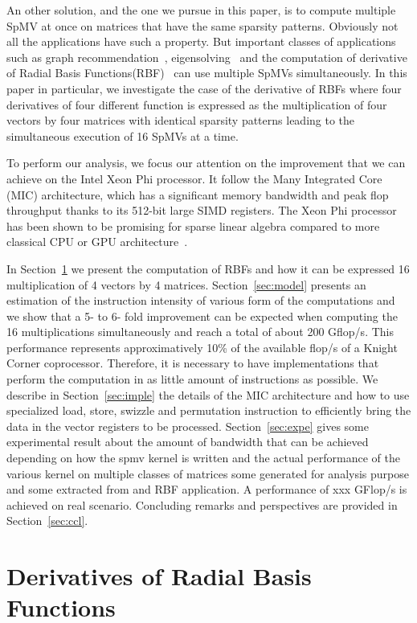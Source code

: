 \documentclass[10pt, conference, compsocconf]{IEEEtran}
\begin{document}
An other solution, and the one we pursue in this paper, is to compute
multiple SpMV at once on matrices that have the same sparsity
patterns. Obviously not all the applications have such a property. But
important classes of applications such as graph
recommendation~\cite{}, eigensolving~\cite{} and the computation of
derivative of Radial Basis Functions(RBF)~\cite{} can use multiple
SpMVs simultaneously. In this paper in particular, we investigate the
case of the derivative of RBFs where four derivatives of four
different function is expressed as the multiplication of four vectors
by four matrices with identical sparsity patterns leading to the
simultaneous execution of 16 SpMVs at a time.

To perform our analysis, we focus our attention on the improvement
that we can achieve on the Intel Xeon Phi processor. It follow the
Many Integrated Core (MIC) architecture, which has a significant
memory bandwidth and peak flop throughput thanks to its 512-bit large
SIMD registers. The Xeon Phi processor has been shown to be promising
for sparse linear algebra compared to more classical CPU or GPU
architecture~\cite{}.

In Section~\ref{sec:rbf} we present the computation of RBFs and how it
can be expressed 16 multiplication of 4 vectors by 4
matrices. Section~\ref{sec:model} presents an estimation of the
instruction intensity of various form of the computations and we show
that a 5- to 6- fold improvement can be expected when computing the 16
multiplications simultaneously and reach a total of about 200
Gflop/s. This performance represents approximatively 10\% of the
available flop/s of a Knight Corner coprocessor. Therefore, it is
necessary to have implementations that perform the computation in as
little amount of instructions as possible. We describe in
Section~\ref{sec:imple} the details of the MIC architecture and how to
use specialized load, store, swizzle and permutation instruction to
efficiently bring the data in the vector registers to be
processed. Section~\ref{sec:expe} gives some experimental result about
the amount of bandwidth that can be achieved depending on how the spmv
kernel is written and the actual performance of the various kernel on
multiple classes of matrices some generated for analysis purpose and
some extracted from and RBF application. A performance of xxx GFlop/s
is achieved on real scenario. Concluding remarks and perspectives are
provided in Section~\ref{sec:ccl}.

\section{Derivatives of Radial Basis Functions}
\label{sec:rbf}
\end{document}
